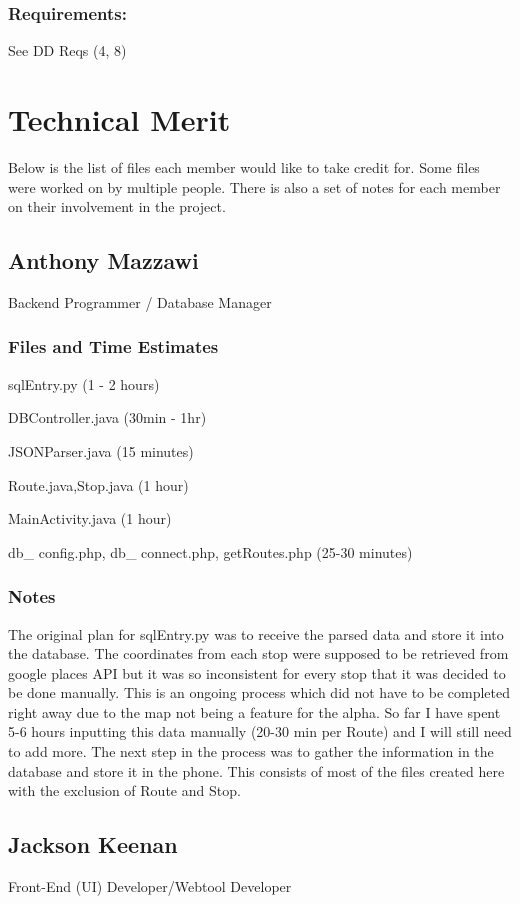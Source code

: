 \documentclass[a4paper,12pt]{article}
\begin{document}
\subsubsection{Requirements:}See DD Reqs (4, 8)
\section{Technical Merit}
Below is the list of files each member would like to take credit for. Some files were worked on by multiple people.
There is also a set of notes for each member on their involvement in the project.
\subsection{Anthony Mazzawi}
Backend Programmer / Database Manager

\subsubsection{Files and Time Estimates}
sqlEntry.py (1 - 2 hours)

DBController.java (30min - 1hr)

JSONParser.java (15 minutes)

Route.java,Stop.java (1 hour)

MainActivity.java (1 hour)

db\_ config.php, db\_ connect.php, getRoutes.php (25-30 minutes)


\subsubsection{Notes}
The original plan for sqlEntry.py was to receive the parsed data and store it into the database.  The coordinates from each stop were supposed to be retrieved from google places API but it was so inconsistent for every stop that it was decided to be done manually. This is an ongoing process which did not have to be completed right away due to the map not being a feature for the alpha. So far I have spent 5-6 hours inputting this data manually (20-30 min per Route) and I will still need to add more.  The next step in the process was to gather the information in the database and store it in the phone. This consists of most of the files created here with the exclusion of Route and Stop.
\subsection{Jackson Keenan}
Front-End (UI) Developer/Webtool Developer
\end{document}
